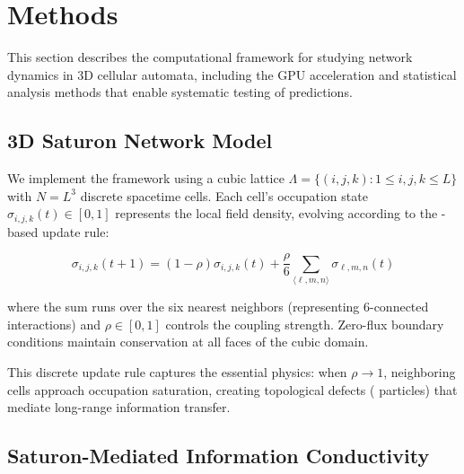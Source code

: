 \section{Methods\label{sec:methods}}

This section describes the computational framework for studying \saturon{} 
network dynamics in 3D cellular automata, including the GPU acceleration 
and statistical analysis methods that enable systematic testing of \posp{} 
predictions.

\subsection{3D Saturon Network Model}

We implement the \posp{} framework using a cubic lattice 
$\Lambda = \{(i,j,k) : 1 \leq i,j,k \leq L\}$ with $N = L^3$ discrete 
spacetime cells. Each cell's occupation state $\sigma_{i,j,k}(t) \in [0,1]$ 
represents the local \saturon{} field density, evolving according to the 
\posp{}-based update rule:

\begin{equation}
\sigma_{i,j,k}(t+1) = (1-\rho)\sigma_{i,j,k}(t) + \frac{\rho}{6}\sum_{\langle \ell,m,n \rangle} \sigma_{\ell,m,n}(t)
\label{eq:saturon_update}
\end{equation}

where the sum runs over the six nearest neighbors (representing 6-connected 
\saturon{} interactions) and $\rho \in [0,1]$ controls the \saturon{} coupling 
strength. Zero-flux boundary conditions maintain \saturon{} conservation at 
all faces of the cubic domain.

This discrete update rule captures the essential \posp{} physics: when 
$\rho \rightarrow 1$, neighboring cells approach occupation saturation, 
creating topological defects (\saturon{} particles) that mediate long-range 
information transfer.

\subsection{Saturon-Mediated Information Conductivity}

